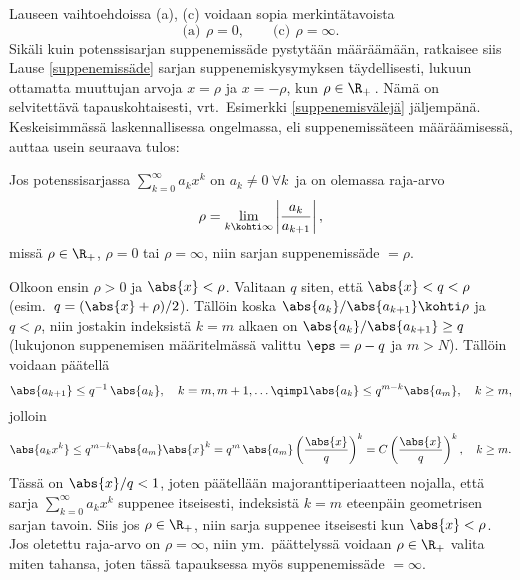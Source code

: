 Lauseen vaihtoehdoissa (a), (c) voidaan sopia merkintätavoista
\[
\text{(a)} \,\ \rho=0, \qquad \text{(c)}\,\ \rho=\infty.
\]
Sikäli kuin potenssisarjan suppenemissäde pystytään määräämään, ratkaisee siis
Lause \ref{suppenemissäde} sarjan suppenemiskysymyksen täydellisesti, lukuun ottamatta 
muuttujan arvoja  $x = \rho$ ja $x = -\rho$, kun $\rho \in \R_+\,$. Nämä on selvitettävä 
tapauskohtaisesti, vrt.\ Esimerkki \ref{suppenemisvälejä} jäljempänä. Keskeisimmässä 
laskennallisessa ongelmassa, eli suppenemissäteen määräämisessä, auttaa usein seuraava tulos:
\begin{Lause}  \label{suppenemissäteen laskukaava}
  Jos potenssisarjassa
\newline
$\sum_{k=0}^\infty a_k x^k$ on $a_k \neq 0\ \forall k\,$ ja on olemassa raja-arvo
\[
\rho=\lim_{k\kohti\infty} \left|\frac{a_k}{a_{k+1}}\right|,
\]
missä $\rho\in\R_+$, $\rho=0$ tai $\rho=\infty$, niin sarjan suppenemissäde $=\rho$.
\end{Lause}
\tod Olkoon ensin $\rho>0$ ja $\abs{x} < \rho$. Valitaan $q$ siten, että $\abs{x} < q < \rho$ 
(esim.\ $q = (\abs{x}+\rho)/2$). Tällöin koska $\abs{a_k}/\abs{a_{k+1}} \kohti \rho$ ja 
$q < \rho$, niin jostakin indeksistä $k=m$ alkaen on $\abs{a_k}/\abs{a_{k+1}} \ge q$ 
(lukujonon suppenemisen määritelmässä valittu $\eps = \rho-q$ ja $m>N$). Tällöin voidaan
päätellä
\[
\abs{a_{k+1}} \le q^{-1}\,\abs{a_k},\quad k = m,m+1, \ldots 
               \qimpl \abs{a_k} \le q^{m-k}\abs{a_m}, \quad k \ge m,
\]
jolloin
\[
\abs{a_k x^k} \le q^{m-k}\abs{a_m}\abs{x}^k = q^m\,\abs{a_m}\left(\frac{\abs{x}}{q}\right)^k 
                                            = C\left(\frac{\abs{x}}{q}\right)^k, \quad k \ge m.
\]
Tässä on $\abs{x}/q < 1$, joten päätellään majoranttiperiaatteen nojalla, että sarja 
$\sum_{k=0}^\infty a_k x^k$ suppenee itseisesti, indeksistä $k=m$ eteenpäin geometrisen sarjan
tavoin. Siis jos $\rho \in \R_+$, niin sarja suppenee itseisesti kun $\abs{x} < \rho$. Jos 
oletettu raja-arvo on $\rho = \infty$, niin ym.\ päättelyssä voidaan $\rho \in \R_+$ valita 
miten tahansa, joten tässä tapauksessa myös suppenemissäde $= \infty$.

